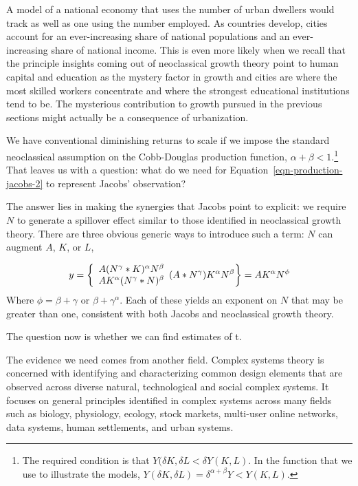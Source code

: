 A model of a national economy that uses the number of urban dwellers would track as well as one using the number employed. As countries develop, cities account for an ever-increasing share of  national populations and an ever-increasing share of national income.  This is  even more likely when we recall that the principle insights coming out of neoclassical growth theory point to human capital and education as the mystery factor in growth and cities are where the most skilled workers concentrate and where the strongest educational institutions tend to be. The mysterious contribution to growth pursued in the previous sections might  actually be a consequence of urbanization.

We have conventional diminishing returns to scale  if we impose the standard neoclassical assumption on the \gls{Cobb-Douglas} production function, 
$\alpha +\beta <1 $.\footnote{
The required condition is that 
$Y(\delta K,\delta L< \delta Y(K,L)$. 
In the function that we use to illustrate the models, 
$Y(\delta K,\delta L)= \delta^{\alpha +\beta}Y < Y(K,L)$.} 
That leaves us with a question: what do we need for Equation~\ref{eqn-production-jacobs-2} to represent Jacobs' observation?  

The answer lies in making the synergies that Jacobs point to explicit: we require $N$ to generate a spillover effect similar to those  identified in neoclassical growth theory. There are three obvious generic ways to introduce such a term: $N$ can augment $A$, $K$, or $L$, 

\begin{equation}
  y=\left\{
  \begin{array}{l}
    A (N^\gamma* K)^\alpha  N^\beta\\
    A K^\alpha (N^\gamma* N)^\beta
  \end{array}
     (A*N^\gamma) K^\alpha N^\beta\\
  \right\} =  AK^\alpha N^\phi
\end{equation}    
Where $\phi=\beta +\gamma$ or $\beta +\gamma^\alpha$. Each of these yields an exponent on $N$ that may be greater than one, consistent with both Jacobs and neoclassical growth theory. 

The question now is whether we can find estimates of t.

The evidence we need comes from another field. Complex systems theory is concerned with identifying and characterizing common design elements that are observed across diverse natural, technological and social complex systems. It focuses on general principles  identified in complex systems across many fields such as biology, physiology, ecology, stock markets, multi-user online  networks, data systems, human settlements, and urban systems.

